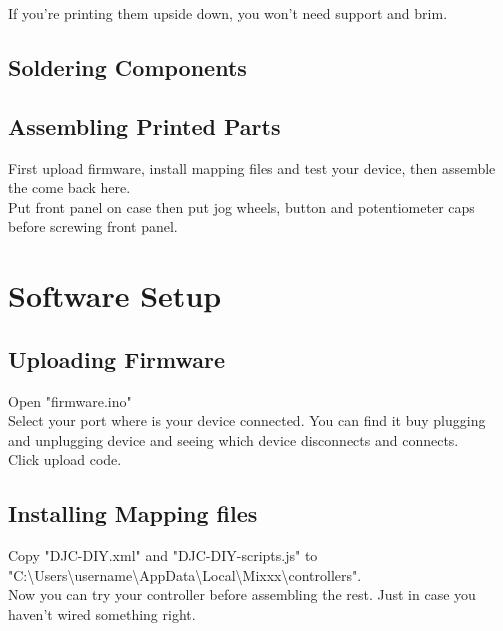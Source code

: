 \documentclass[12pt, a4paper]{article}
\begin{document}
				\noindent If you're printing them upside down, you won't need support and brim.
				
		\subsection{Soldering Components}
		\subsection{Assembling Printed Parts}
			
			\noindent First upload firmware, install mapping files and test your device, then assemble the come back here. \\
		
			\noindent Put front panel on case then put jog wheels, button and potentiometer caps before screwing front panel.
			
			
	\section{Software Setup}
	
		\subsection{Uploading Firmware}
			\noindent Open "firmware.ino" \\
			
			\noindent Select your port where is your device connected. You can find it buy plugging and unplugging device and seeing which device disconnects and connects. \\
			
			\noindent Click upload code. \\
			
		\subsection{Installing Mapping files}
			\noindent Copy "DJC-DIY.xml" and "DJC-DIY-scripts.js" to \\ "C:\textbackslash{}Users\textbackslash{}username\textbackslash{}AppData\textbackslash{}Local\textbackslash{}Mixxx\textbackslash{}controllers". \\
			
			\noindent Now you can try your controller before assembling the rest. Just in case you haven't wired something right.
	
\end{document}

